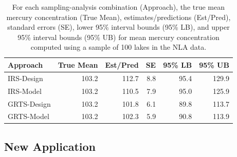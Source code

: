 \documentclass[]{elsarticle} %
\begin{document}
\begin{table}[ht]
\centering
\begin{tabular}{lrrrrr}
  \hline
Approach & True Mean & Est/Pred & SE & 95\% LB & 95\% UB \\ 
  \hline
IRS-Design & 103.2 & 112.7 & 8.8 & 95.4 & 129.9 \\ 
  IRS-Model & 103.2 & 110.5 & 7.9 & 95.0 & 125.9 \\ 
  GRTS-Design & 103.2 & 101.8 & 6.1 & 89.8 & 113.7 \\ 
  GRTS-Model & 103.2 & 102.3 & 5.9 & 90.8 & 113.9 \\ 
   \hline
\end{tabular}
\caption{\label{tab:appliedtab} For each sampling-analysis combination (Approach), the true mean mercury concentration (True Mean), estimates/predictions (Est/Pred), standard errors (SE), lower 95\% interval bounds (95\% LB), and upper 95\% interval bounds (95\% UB) for mean mercury concentration computed using a sample of 100 lakes in the NLA data.} 
\end{table}

\hypertarget{new-application}{%
\subsection{New Application}\label{new-application}}
\end{document}
